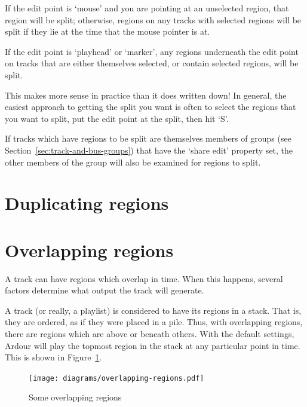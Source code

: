 \documentclass[10pt,a4paper]{book}
\begin{document}
{If the edit point is `mouse' and you are pointing at an unselected
region, that region will be split; otherwise, regions on any tracks
with selected regions will be split if they lie at the time that the
mouse pointer is at.

If the edit point is `playhead' or `marker', any regions underneath
the edit point on tracks that are either themselves selected, or
contain selected regions, will be split.

This makes more sense in practice than it does written down!  In
general, the easiest approach to getting the split you want is often
to select the regions that you want to split, put the edit point at
the split, then hit `S'.

If tracks which have regions to be split are themselves members of
groups (see Section~\ref{sec:track-and-bus-groups}) that have the
`share edit' property set, the other members of the group will also be
examined for regions to split.



\section{Duplicating regions}



\section{Overlapping regions}
\label{sec:overlapping-regions}

A track can have regions which overlap in time.  When this happens,
several factors determine what output the track will generate.

A track (or really, a playlist) is considered to have its regions in a
stack.  That is, they are ordered, as if they were placed in a pile.
Thus, with overlapping regions, there are regions which are above or
beneath others.  With the default settings, Ardour will play the
topmost region in the stack at any particular point in time.  This is
shown in Figure~\ref{fig:overlapping-regions}.

\begin{figure}[ht]
\begin{center}
\texttt{[image: diagrams/overlapping-regions.pdf]}
\end{center}
\caption{Some overlapping regions}
\label{fig:overlapping-regions}
\end{figure}

}
\end{document}
